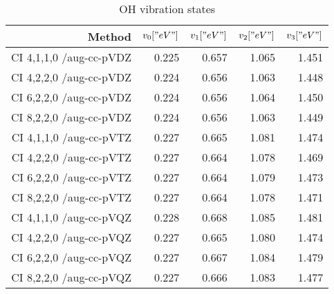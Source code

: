 \begin{table}[]
\centering
\caption{OH vibration states}
\label{TODO}
\begin{tabular}{rrrrr}
\toprule
Method & $v_0 [" eV"]$ & $v_1 [" eV"]$ & $v_2 [" eV"]$ & $v_3[" eV"]$ \\ \midrule
CI 4,1,1,0 /aug-cc-pVDZ & 0.225 & 0.657 & 1.065 & 1.451\\
CI 4,2,2,0 /aug-cc-pVDZ & 0.224 & 0.656 & 1.063 & 1.448\\
CI 6,2,2,0 /aug-cc-pVDZ & 0.224 & 0.656 & 1.064 & 1.450\\
CI 8,2,2,0 /aug-cc-pVDZ & 0.224 & 0.656 & 1.063 & 1.449\\
CI 4,1,1,0 /aug-cc-pVTZ & 0.227 & 0.665 & 1.081 & 1.474\\
CI 4,2,2,0 /aug-cc-pVTZ & 0.227 & 0.664 & 1.078 & 1.469\\
CI 6,2,2,0 /aug-cc-pVTZ & 0.227 & 0.664 & 1.079 & 1.473\\
CI 8,2,2,0 /aug-cc-pVTZ & 0.227 & 0.664 & 1.078 & 1.471\\
CI 4,1,1,0 /aug-cc-pVQZ & 0.228 & 0.668 & 1.085 & 1.481\\
CI 4,2,2,0 /aug-cc-pVQZ & 0.227 & 0.665 & 1.080 & 1.474\\
CI 6,2,2,0 /aug-cc-pVQZ & 0.227 & 0.667 & 1.084 & 1.479\\
CI 8,2,2,0 /aug-cc-pVQZ & 0.227 & 0.666 & 1.083 & 1.477\\
\bottomrule
\end{tabular}
\end{table}
    